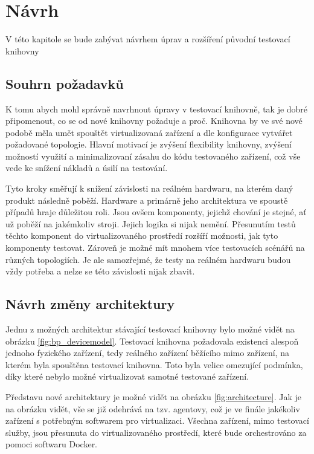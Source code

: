 \chapter{Návrh}\label{chap:design}

V této kapitole se bude zabývat návrhem úprav a rozšíření původní testovací knihovny


\section{Souhrn požadavků}

K tomu abych mohl správně navrhnout úpravy v testovací knihovně, tak je dobré připomenout, co se od nové knihovny požaduje a proč. Knihovna by ve své nové podobě měla umět spouštět virtualizovaná zařízení a dle konfigurace vytvářet požadované topologie. Hlavní motivací je zvýšení flexibility knihovny, zvýšení možností využití a minimalizovaní zásahu do kódu testovaného zařízení, což vše vede ke snížení nákladů a úsilí na testování.  

Tyto kroky směřují k snížení závislosti na reálném hardwaru, na kterém daný produkt následně poběží. Hardware a primárně jeho architektura ve spoustě případů hraje důležitou roli. Jsou ovšem komponenty, jejichž chování je stejné, ať už poběží na jakémkoliv stroji. Jejich logika si nijak nemění. Přesunutím testů těchto komponent do virtualizovaného prostředí rozšíří možnosti, jak tyto komponenty testovat. Zároveň je možné mít mnohem více testovacích scénářů na různých topologiích. Je ale samozřejmé, že testy na reálném hardwaru budou vždy potřeba a nelze se této závislosti nijak zbavit.


\section{Návrh změny architektury}

Jednu z možných architektur stávající testovací knihovny bylo možné vidět na obrázku \ref{fig:bp_devicemodel}. Testovací knihovna požadovala existenci alespoň jednoho fyzického zařízení, tedy reálného zařízení běžícího mimo zařízení, na kterém byla spouštěna testovací knihovna. 
Toto byla velice omezující podmínka, díky které nebylo možné virtualizovat samotné testované zařízení.

Představu nové architektury je možné vidět na obrázku \ref{fig:architecture}. Jak je na obrázku vidět, vše se již odehrává na tzv. agentovy, což je ve finále jakékoliv zařízení s potřebným softwarem pro virtualizaci. Všechna zařízení, mimo testovací služby, jsou přesunuta do virtualizovaného prostředí, které bude orchestrováno za pomoci softwaru Docker. 

